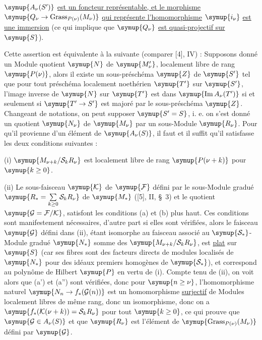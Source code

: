  $\symup{A_\nu(S')}$ \uline{est un foncteur représentable, et le morphisme}
$\symup{Q_\nu\to\operatorname{Grass}_{P(\nu)}(M_\nu)}$ \uline{qui représente
l'homomorphisme} $\symup{i_\nu}$ \uline{est une immersion} (ce qui implique que $\symup{Q_\nu}$ \uline{est
quasi-projectif sur} $\symup{S}$).

Cette assertion est équivalente à la suivante (comparer [4], IV) : Supposons
donné un Module quotient $\symup{N}$ de $\symup{M'_\nu}$, localement libre de rang $\symup{P(\nu)}$,
alors il existe un sous-préschéma $\symup{Z}$ de $\symup{S'}$ tel que pour tout préschéma
localement noethérien $\symup{T'}$
sur $\symup{S'}$, l'image inverse de $\symup{N}$ sur $\symup{T'}$ est dans
$\symup{\operatorname{Im}A_\nu(T')}$ si et seulement si $\symup{T'\to S'}$ est
majoré par le sous-préschéma $\symup{Z}$. Changeant de notations, on peut supposer
$\symup{S'=S}$, i. e. on s'est donné un quotient $\symup{N_\nu}$ de $\symup{M_\nu}$ par un sous-Module
$\symup{R_\nu}$. Pour qu'il provienne d'un élément de $\symup{A_\nu(S)}$, il faut et il suffit
qu'il satisfasse les deux conditions suivantes :

\medskip
\noindent (i) $\symup{M_{\nu+k}/\mathcal S_kR_\nu}$ est localement libre de rang
$\symup{P(\nu+k)}$ pour $\symup{k\geq0}$.

\smallskip
\noindent (ii) Le sous-faisceau $\symup{\mathcal K}$ de $\symup{\mathcal F}$ défini par le
sous-Module gradué
$\symup{R_* =\sum\limits_{k\geq0}\mathcal S_kR_\nu}$
de $\symup{M_*}$ ([5], II, \S~3) et le quotient $\symup{\mathcal G=\mathcal F/\mathcal K}$,
satisfont les conditions (a) et (b) plus haut. Ces conditions sont manifestement nécessaires, d'autre part si elles sont
vérifiées, alors le faisceau $\symup{\mathcal G}$ défini dans (ii), étant isomorphe au
faisceau associé au $\symup{\mathcal S_*}$-Module gradué $\symup{N_*}$ somme des
$\symup{M_{\nu+k}/\mathcal S_kR_\nu}$, est \uline{plat} sur $\symup{S}$ (car ses fibres sont des
facteurs directs de modules localisés de $\symup{N_*}$ pour des idéaux premiers homogènes
de $\symup{\mathcal S_*}$), et correspond au polynôme de Hilbert $\symup{P}$ en vertu de (i).
Compte tenu de (ii), on voit alors que (a') et (a'') sont vérifiées, donc pour
$\symup{n\geq\nu}$, l'homomorphisme naturel
$\symup{N_n\to f_*(\mathcal G(n))}$ est un homomorphisme \uline{surjectif} de
Modules localement libres de même rang, donc un isomorphisme, donc on a
$\symup{f_*(\mathcal K(\nu+k))=\mathcal S_kR_\nu}$ pour tout $\symup{k\geq0}$,
ce qui prouve que $\symup{\mathcal G\in A_\nu(S)}$ et que $\symup{R_\nu}$ est l'élément de
$\symup{\operatorname{Grass}_{P(\nu)}(M_\nu)}$ défini par $\symup{\mathcal G}$.

